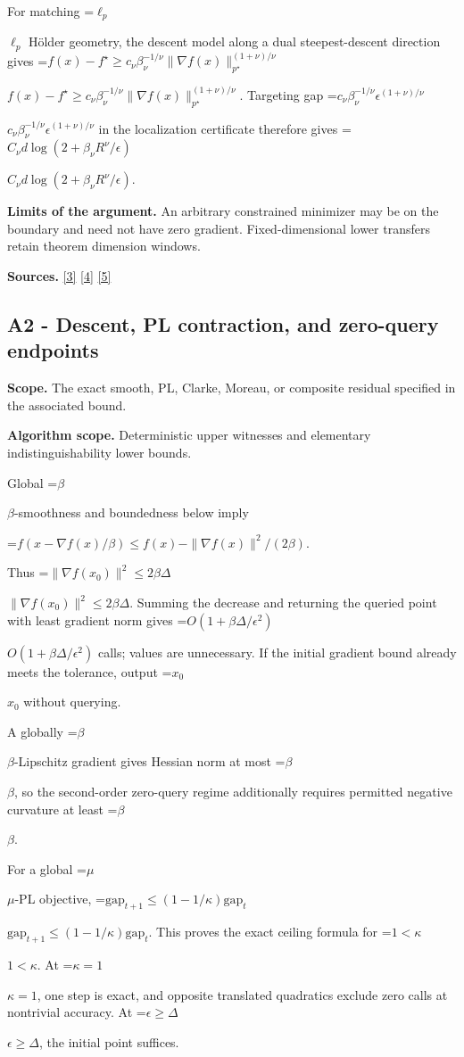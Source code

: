 \documentclass[10pt,a4paper]{article}
\newcommand{\AtlasMath}[1]{\par\begingroup\centering\setbox0=\hbox{$\displaystyle #1$}\ifdim\wd0>1.4\linewidth\typeout{ATLAS WIDE FORMULA: \the\wd0}\fi\ifdim\wd0>\linewidth\resizebox{\linewidth}{!}{\box0}\else\box0\fi\par\endgroup}
\newcommand{\AtlasInlineMath}[1]{\begingroup\setbox0=\hbox{$#1$}\ifdim\wd0>.4\linewidth\endgroup\AtlasMath{#1}\else\endgroup$#1$\fi}
\begin{document}
For matching \AtlasInlineMath{\ell_p} Hölder geometry, the descent model along a dual steepest-descent direction gives
\AtlasInlineMath{f(x)-f^\star\ge c_\nu\beta_\nu^{-1/\nu}\|\nabla f(x)\|_{p^\star}^{(1+\nu)/\nu}}.
Targeting gap \AtlasInlineMath{c_\nu\beta_\nu^{-1/\nu}\epsilon^{(1+\nu)/\nu}} in the localization certificate therefore gives
\AtlasInlineMath{C_\nu d\log(2+\beta_\nu R^\nu/\epsilon)}.

\textbf{Limits of the argument.} An arbitrary constrained minimizer may be on the boundary and need not have zero gradient. Fixed-dimensional lower transfers retain theorem dimension windows.

\textbf{Sources.} \href{https://arxiv.org/pdf/2101.09740v2}{[3]} \href{https://arxiv.org/pdf/2609.33360v2}{[4]} \href{https://arxiv.org/pdf/2609.10874}{[5]}

\subsection{A2 - Descent, PL contraction, and zero-query endpoints}
\textbf{Scope.} The exact smooth, PL, Clarke, Moreau, or composite residual specified in the associated bound.

\textbf{Algorithm scope.} Deterministic upper witnesses and elementary indistinguishability lower bounds.

Global \AtlasInlineMath{\beta}-smoothness and boundedness below imply

\AtlasMath{f(x-\nabla f(x)/\beta)\le f(x)-\|\nabla f(x)\|^2/(2\beta).}

Thus \AtlasInlineMath{\|\nabla f(x_0)\|^2\le2\beta\Delta}. Summing the decrease and returning the queried point with least gradient norm gives \AtlasInlineMath{O(1+\beta\Delta/\epsilon^2)} calls; values are unnecessary. If the initial gradient bound already meets the tolerance, output \AtlasInlineMath{x_0} without querying.

A globally \AtlasInlineMath{\beta}-Lipschitz gradient gives Hessian norm at most \AtlasInlineMath{\beta}, so the second-order zero-query regime additionally requires permitted negative curvature at least \AtlasInlineMath{\beta}.

For a global \AtlasInlineMath{\mu}-PL objective,
\AtlasInlineMath{\mathrm{gap}_{t+1}\le(1-1/\kappa)\mathrm{gap}_t}.
This proves the exact ceiling formula for \AtlasInlineMath{1<\kappa}. At \AtlasInlineMath{\kappa=1}, one step is exact, and opposite translated quadratics exclude zero calls at nontrivial accuracy. At \AtlasInlineMath{\epsilon\ge\Delta}, the initial point suffices.
\end{document}
